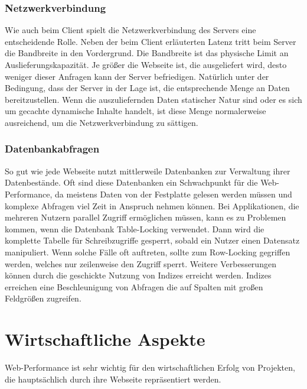\subsubsection{Netzwerkverbindung}
Wie auch beim Client spielt die Netzwerkverbindung des Servers eine entscheidende Rolle. Neben der beim Client erl\"auterten Latenz tritt beim Server die Bandbreite in den Vordergrund. Die Bandbreite ist das physische Limit an Auslieferungskapazität. Je gr\"o\ss{}er die Webseite ist, die ausgeliefert wird, desto weniger dieser Anfragen kann der Server befriedigen. Nat\"urlich unter der Bedingung, dass der Server in der Lage ist, die entsprechende Menge an Daten bereitzustellen. Wenn die auszuliefernden Daten statischer Natur sind oder es sich um gecachte dynamische Inhalte handelt, ist diese Menge normalerweise ausreichend, um die Netzwerkverbindung zu s\"attigen. 

  

\subsubsection{Datenbankabfragen}
So gut wie jede Webseite nutzt mittlerweile Datenbanken zur Verwaltung ihrer Datenbestände.
Oft sind diese Datenbanken ein Schwachpunkt für die Web-Performance, da meistens Daten von der Festplatte gelesen werden müssen und komplexe Abfragen viel Zeit in Anspruch nehmen können. Bei Applikationen, die mehreren Nutzern parallel Zugriff erm\"oglichen m\"ussen, kann es zu Problemen kommen, wenn die Datenbank Table-Locking verwendet. Dann wird die komplette Tabelle f\"ur Schreibzugriffe gesperrt, sobald ein Nutzer einen Datensatz manipuliert. Wenn solche F\"alle oft auftreten, sollte zum Row-Locking gegriffen werden, welches nur zeilenweise den Zugriff sperrt. Weitere Verbesserungen k\"onnen durch die geschickte Nutzung von Indizes erreicht werden. Indizes erreichen eine Beschleunigung von Abfragen die auf Spalten mit gro\ss{}en Feldgr\"o\ss{}en zugreifen. 


\section{Wirtschaftliche Aspekte}
Web-Performance ist sehr wichtig f\"ur den wirtschaftlichen Erfolg von Projekten, die haupts\"achlich durch ihre Webseite repr\"asentiert werden.
